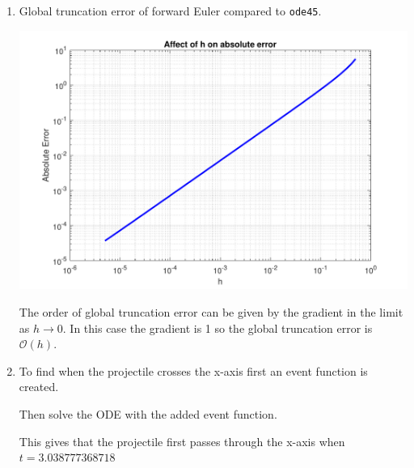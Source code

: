 \documentclass[a4paper,11pt]{article}
\newcommand{\order}{\mathcal{O}}
\begin{document}
\begin{enumerate}
	
	\item Global truncation error of forward Euler compared to \verb*|ode45|.
	\begin{center}
		\includegraphics[scale=0.7]{images/Q3d.pdf}
	\end{center}
	The order of global truncation error can be given by the gradient in the 
	limit as $h \xrightarrow{} 0$. In this case the gradient is 1 so the 
	global truncation error is $\order(h)$.
	
	\item To find when the projectile crosses the x-axis first an event 
	function is created.
	
	Then solve the ODE with the added event function.
	
	This gives that the projectile first passes through the x-axis when 
	$t=3.038777368718$
	

\end{enumerate}
\end{document}
